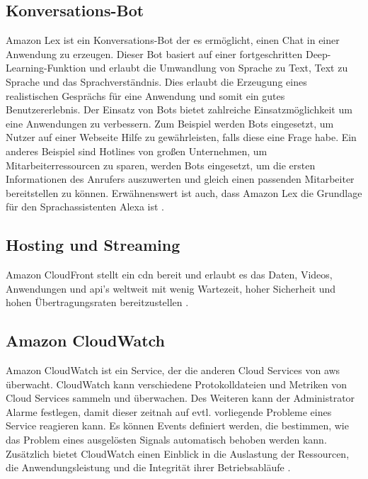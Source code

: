 \subsection{Konversations-Bot}
Amazon Lex ist ein Konversations-Bot der es ermöglicht, einen Chat in einer Anwendung zu erzeugen. Dieser Bot basiert auf einer fortgeschritten Deep-Learning-Funktion und erlaubt die Umwandlung von Sprache zu Text, Text zu Sprache und das Sprachverständnis. Dies erlaubt die Erzeugung eines realistischen Gesprächs für eine Anwendung und somit ein gutes Benutzererlebnis. Der Einsatz von Bots bietet zahlreiche Einsatzmöglichkeit um eine Anwendungen zu verbessern. Zum Beispiel werden Bots eingesetzt, um Nutzer auf einer Webseite Hilfe zu gewährleisten, falls diese eine Frage habe. Ein anderes Beispiel sind Hotlines von großen Unternehmen, um Mitarbeiterressourcen zu sparen, werden Bots eingesetzt, um die ersten Informationen des Anrufers auszuwerten und gleich einen passenden Mitarbeiter bereitstellen zu können. Erwähnenswert ist auch, dass Amazon Lex die Grundlage für den Sprachassistenten Alexa ist \cite{AmazonLex}.

\subsection{Hosting und Streaming}
Amazon CloudFront stellt ein \gls{cdn} bereit und erlaubt es das Daten, Videos, Anwendungen und \gls{api}'s weltweit mit wenig Wartezeit, hoher Sicherheit und hohen Übertragungsraten bereitzustellen \cite{AmazonCloudFront}. 

\subsection{Amazon CloudWatch}
Amazon CloudWatch ist ein Service, der die anderen Cloud Services von \gls{aws} überwacht. CloudWatch kann verschiedene Protokolldateien und Metriken von Cloud Services sammeln und überwachen. Des Weiteren kann der Administrator Alarme festlegen, damit dieser zeitnah auf evtl. vorliegende Probleme eines Service reagieren kann. Es können Events definiert werden, die bestimmen, wie das Problem eines ausgelösten Signals automatisch behoben werden kann. Zusätzlich bietet CloudWatch einen Einblick in die Auslastung der Ressourcen, die Anwendungsleistung und die Integrität ihrer Betriebsabläufe \cite{AmazonCloudWatch}.
